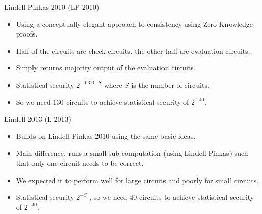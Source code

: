 \documentclass[t, 12pt]{beamer}            %
\begin{document}
\begin{frame}{Lindell-Pinkas 2010 (LP-2010)}
	\begin{itemize} %
		\item Using a conceptually elegant approach to consistency using Zero Knowledge proofs.
		\item Half of the circuits are check circuits, the other half are evaluation circuits.
		\item Simply returns majority output of the evaluation circuits.
		\item Statistical security $2^{-0.311 \cdot S}$  where $S$ is the number of circuits.
		\item So we need $130$ circuits to achieve statistical security of $2^{-40}$.
	\end{itemize}

\end{frame}


\begin{frame}{Lindell 2013 (L-2013)}
	\begin{itemize} %
		\item Builds on Lindell-Pinkas 2010 using the same basic ideas.  %
		\item Main difference, runs a small sub-computation (using Lindell-Pinkas) such that only one circuit needs to be correct.
		\item We expected it to perform well for large circuits and poorly for small circuits.
		\item Statistical security $2^{-S}$ , so we need $40$ circuits to achieve statistical security of $2^{-40}$.
	\end{itemize}

\end{frame}
\end{document}
